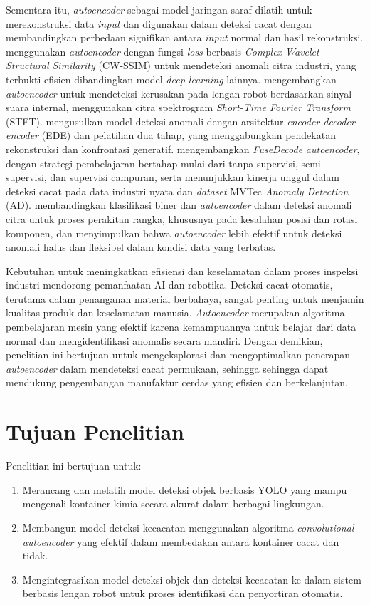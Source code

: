 Sementara itu, \textit{autoencoder} sebagai model jaringan saraf
dilatih untuk merekonstruksi data \textit{input} dan digunakan
dalam deteksi cacat dengan membandingkan perbedaan signifikan antara
\textit{input} normal dan hasil rekonstruksi.
\citet{14} menggunakan \textit{autoencoder} dengan
fungsi \textit{loss} berbasis \textit{Complex Wavelet Structural
Similarity} (CW-SSIM) untuk mendeteksi anomali citra industri, yang
terbukti efisien dibandingkan model \textit{deep learning} lainnya.
\citet{15} mengembangkan \textit{autoencoder} untuk mendeteksi kerusakan
pada lengan robot berdasarkan sinyal suara internal, menggunakan
citra spektrogram \textit{Short-Time Fourier Transform}
(STFT). \citet{16} mengusulkan model
deteksi anomali dengan arsitektur \textit{encoder-decoder-encoder}
(EDE) dan pelatihan dua tahap, yang
menggabungkan pendekatan rekonstruksi dan konfrontasi generatif.
\citet{17} mengembangkan \textit{FuseDecode} \textit{autoencoder},
dengan strategi pembelajaran bertahap mulai dari tanpa supervisi,
semi-supervisi, dan supervisi campuran, serta menunjukkan kinerja unggul
dalam deteksi cacat pada data industri nyata dan \textit{dataset}
MVTec \textit{Anomaly Detection} (AD). \citet{18} membandingkan
klasifikasi biner dan \textit{autoencoder} dalam deteksi anomali
citra untuk proses perakitan rangka, khususnya pada kesalahan posisi
dan rotasi komponen, dan menyimpulkan bahwa \textit{autoencoder}
lebih efektif untuk deteksi anomali halus dan fleksibel dalam kondisi
data yang terbatas.

Kebutuhan untuk meningkatkan efisiensi dan keselamatan dalam proses inspeksi
industri mendorong pemanfaatan AI dan robotika. Deteksi cacat
otomatis, terutama dalam penanganan material berbahaya, sangat
penting untuk menjamin kualitas produk dan keselamatan manusia.
\textit{Autoencoder} merupakan algoritma pembelajaran mesin yang
efektif karena kemampuannya untuk belajar dari data normal dan
mengidentifikasi anomalis secara mandiri.
Dengan demikian, penelitian ini bertujuan untuk mengeksplorasi dan
mengoptimalkan penerapan \textit{autoencoder} dalam mendeteksi cacat
permukaan, sehingga sehingga dapat mendukung pengembangan manufaktur
cerdas yang efisien dan berkelanjutan.

\vspace{1em}

\section{Tujuan Penelitian}
Penelitian ini bertujuan untuk:
\begin{enumerate}
  \item Merancang dan melatih model deteksi objek berbasis YOLO yang
    mampu mengenali kontainer kimia secara akurat dalam berbagai lingkungan.
  \item Membangun model deteksi kecacatan menggunakan algoritma
    \textit{convolutional autoencoder} yang efektif dalam membedakan
    antara kontainer cacat dan tidak.
  \item Mengintegrasikan model deteksi objek dan deteksi kecacatan ke
    dalam sistem berbasis lengan robot untuk proses identifikasi dan
    penyortiran otomatis.
\end{enumerate}


